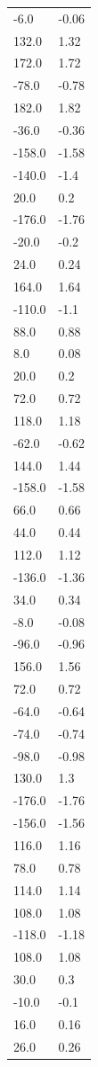 \begin{longtable}{ll}
-6.0 & -0.06 \\
132.0 & 1.32 \\
172.0 & 1.72 \\
-78.0 & -0.78 \\
182.0 & 1.82 \\
-36.0 & -0.36 \\
-158.0 & -1.58 \\
-140.0 & -1.4 \\
20.0 & 0.2 \\
-176.0 & -1.76 \\
-20.0 & -0.2 \\
24.0 & 0.24 \\
164.0 & 1.64 \\
-110.0 & -1.1 \\
88.0 & 0.88 \\
8.0 & 0.08 \\
20.0 & 0.2 \\
72.0 & 0.72 \\
118.0 & 1.18 \\
-62.0 & -0.62 \\
144.0 & 1.44 \\
-158.0 & -1.58 \\
66.0 & 0.66 \\
44.0 & 0.44 \\
112.0 & 1.12 \\
-136.0 & -1.36 \\
34.0 & 0.34 \\
-8.0 & -0.08 \\
-96.0 & -0.96 \\
156.0 & 1.56 \\
72.0 & 0.72 \\
-64.0 & -0.64 \\
-74.0 & -0.74 \\
-98.0 & -0.98 \\
130.0 & 1.3 \\
-176.0 & -1.76 \\
-156.0 & -1.56 \\
116.0 & 1.16 \\
78.0 & 0.78 \\
114.0 & 1.14 \\
108.0 & 1.08 \\
-118.0 & -1.18 \\
108.0 & 1.08 \\
30.0 & 0.3 \\
-10.0 & -0.1 \\
16.0 & 0.16 \\
26.0 & 0.26 \\

\end{longtable}
